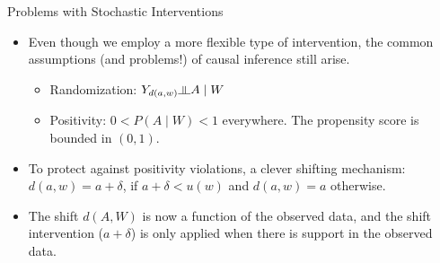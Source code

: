 \documentclass[12pt,t]{beamer}
\newcommand{\indep}{\rotatebox[origin=c]{90}{$\models$}}
\begin{document}

\begin{frame}[c]{Problems with Stochastic Interventions}

\begin{center}
\begin{itemize}
  \itemsep10pt
  \item Even though we employ a more flexible type of intervention, the common
    assumptions (and problems!) of causal inference still arise.
    \begin{itemize}
      \item Randomization: $Y_{d(a,w)} \indep A \mid W$
      \item Positivity: $0 < P(A \mid W) < 1$ everywhere. The propensity score
        is bounded in $(0, 1)$.
    \end{itemize}
  \item To protect against positivity violations, a clever shifting mechanism:
    $d(a, w) = a + \delta$, if $a + \delta < u(w)$ and $d(a, w) = a$ otherwise.
  \item The shift $d(A, W)$ is now a function of the observed data, and the
    shift intervention ($a + \delta$) is only applied when there is support in
    the observed data.

\end{itemize}
\end{center}

\note{
}

\end{frame}


\end{document}
